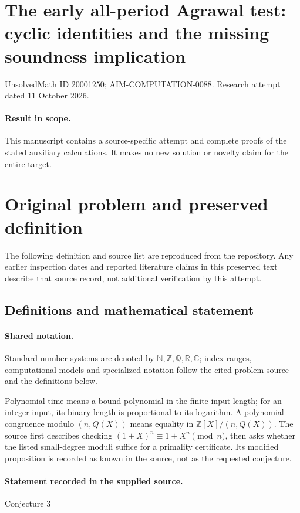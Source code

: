 \documentclass[11pt]{article}
\begin{document}
\section*{The early all-period Agrawal test: cyclic identities and the missing soundness implication}
\noindent UnsolvedMath ID 20001250; AIM-COMPUTATION-0088. Research attempt dated 11 October 2026.
\paragraph{Result in scope.}This manuscript contains a source-specific attempt and complete proofs of the stated auxiliary calculations. It makes no new solution or novelty claim for the entire target.
\section{Original problem and preserved definition}
The following definition and source list are reproduced from the repository. Any earlier inspection dates and reported literature claims in this preserved text describe that source record, not additional verification by this attempt.
\subsection{Definitions and mathematical statement}

\paragraph{Shared notation.}Standard number systems are denoted by $\mathbb N,\mathbb Z,\mathbb Q,\mathbb R,\mathbb C$; index ranges, computational models and specialized notation follow the cited problem source and the definitions below.


Polynomial time means a bound polynomial in the finite input length; for an integer input, its binary length is proportional to its logarithm. A polynomial congruence modulo $(n,Q(X))$ means equality in $\mathbb Z[X]/(n,Q(X))$. The source first describes checking $(1+X)^n\equiv1+X^n\pmod n$, then asks whether the listed small-degree moduli suffice for a primality certificate. Its modified proposition is recorded as known in the source, not as the requested conjecture.
\paragraph{Statement recorded in the supplied source.}
Conjecture 3
\end{document}
